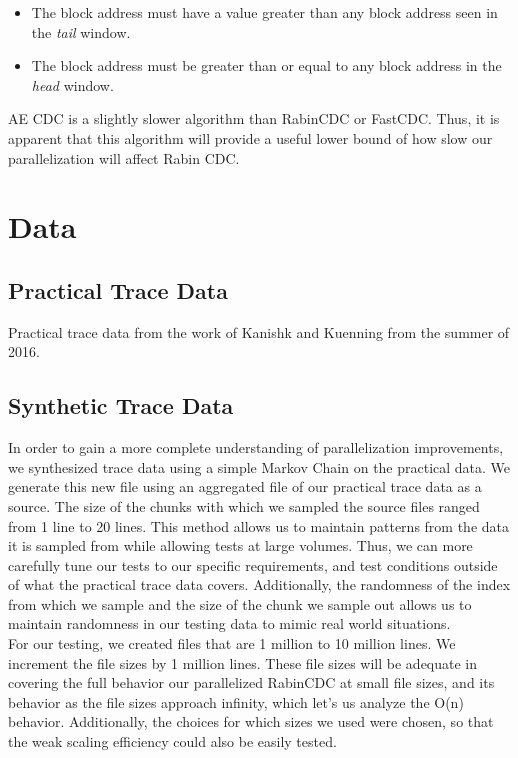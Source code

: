 \documentclass{acmtog} %
\begin{document}
	\begin{itemize}
	\item The block address must have a value greater than any block address seen in the \textit{tail} window.
	\item The block address must be greater than or equal to any block address in the \textit{head} window.
	\end{itemize}
	
	AE CDC is a slightly slower algorithm than RabinCDC or FastCDC. Thus, it is apparent that this algorithm will provide a useful lower bound of how slow our parallelization will affect Rabin CDC.

	\section{Data}
	\subsection{Practical Trace Data}

	Practical trace data from the work of Kanishk and Kuenning from the summer of 2016. \\
	\subsection{Synthetic Trace Data}
	In order to gain a more complete understanding of parallelization improvements, we synthesized trace data using a simple Markov Chain on the practical data. We generate this new file using an aggregated file of our practical trace data as a source. The size of the chunks with which we sampled the source files ranged from 1 line to 20 lines. This method allows us to maintain patterns from the data it is sampled from while allowing tests at large volumes. Thus, we can more carefully tune our tests to our specific requirements, and test conditions outside of what the practical trace data covers. Additionally, the randomness of the index from which we sample and the size of the chunk we sample out allows us to maintain randomness in our testing data to mimic real world situations.\\
	
	For our testing, we created files that are 1 million to 10 million lines. We increment the file sizes by 1 million lines. These file sizes will be adequate in covering the full behavior our parallelized RabinCDC at small file sizes, and its behavior as the file sizes approach infinity, which let's us analyze the O(n) behavior. Additionally, the choices for which sizes we used were chosen, so that the weak scaling efficiency could also be easily tested.
	
\end{document}
